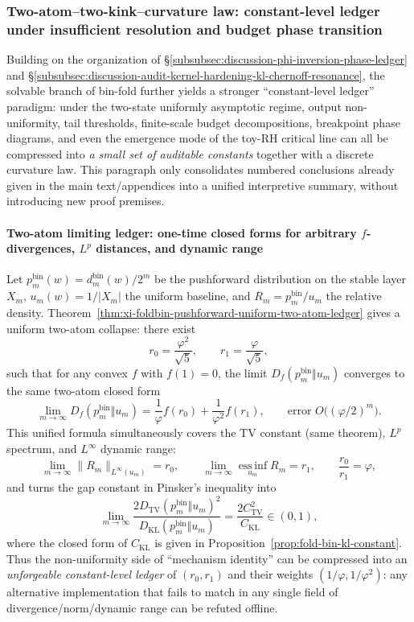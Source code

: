 
\subsubsection{Two-atom–two-kink–curvature law: constant-level ledger under insufficient resolution and budget phase transition}\label{subsubsec:discussion-two-atom-ledger-curvature-bias-toy-rh}
Building on the organization of \S\ref{subsubsec:discussion-phi-inversion-phase-ledger} and \S\ref{subsubsec:discussion-audit-kernel-hardening-kl-chernoff-resonance}, the solvable branch of bin-fold further yields a stronger ``constant-level ledger'' paradigm:
under the two-state uniformly asymptotic regime, output non-uniformity, tail thresholds, finite-scale budget decompositions, breakpoint phase diagrams, and even the emergence mode of the toy-RH critical line can all be compressed into \emph{a small set of auditable constants} together with a discrete curvature law.
This paragraph only consolidates numbered conclusions already given in the main text/appendices into a unified interpretive summary, without introducing new proof premises.

\paragraph{Two-atom limiting ledger: one-time closed forms for arbitrary \texorpdfstring{$f$}{f}-divergences, \texorpdfstring{$L^p$}{Lp} distances, and dynamic range}
Let \(p_m^{\mathrm{bin}}(w)=d_m^{\mathrm{bin}}(w)/2^m\) be the pushforward distribution on the stable layer \(X_m\), \(u_m(w)=1/|X_m|\) the uniform baseline, and \(R_m=p_m^{\mathrm{bin}}/u_m\) the relative density.
Theorem~\ref{thm:xi-foldbin-pushforward-uniform-two-atom-ledger} gives a uniform two-atom collapse: there exist
\[
r_0=\frac{\varphi^2}{\sqrt5},\qquad r_1=\frac{\varphi}{\sqrt5},
\]
such that for any convex \(f\) with \(f(1)=0\), the limit \(D_f(p_m^{\mathrm{bin}}\Vert u_m)\) converges to the same two-atom closed form
\[
\lim_{m\to\infty}D_f(p_m^{\mathrm{bin}}\Vert u_m)
=\frac{1}{\varphi}f(r_0)+\frac{1}{\varphi^2}f(r_1),
\qquad
\text{error }O\!\bigl((\varphi/2)^m\bigr).
\]
This unified formula simultaneously covers the TV constant (same theorem), \(L^p\) spectrum, and \(L^\infty\) dynamic range:
\[
\lim_{m\to\infty}\|R_m\|_{L^\infty(u_m)}=r_0,\qquad
\lim_{m\to\infty}\operatorname*{ess\,inf}_{u_m}R_m=r_1,\qquad
\frac{r_0}{r_1}=\varphi,
\]
and turns the gap constant in Pinsker's inequality into
\[
\lim_{m\to\infty}\frac{2D_{\mathrm{TV}}(p_m^{\mathrm{bin}}\Vert u_m)^2}{D_{\mathrm{KL}}(p_m^{\mathrm{bin}}\Vert u_m)}
=\frac{2C_{\mathrm{TV}}^2}{C_{\mathrm{KL}}}\in(0,1),
\]
where the closed form of \(C_{\mathrm{KL}}\) is given in Proposition~\ref{prop:fold-bin-kl-constant}.
Thus the non-uniformity side of ``mechanism identity'' can be compressed into an \emph{unforgeable constant-level ledger} of \((r_0,r_1)\) and their weights \((1/\varphi,1/\varphi^2)\): any alternative implementation that fails to match in any single field of divergence/norm/dynamic range can be refuted offline.

